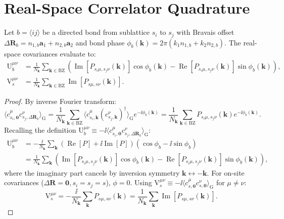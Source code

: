 \section{Real-Space Correlator Quadrature}
\label{sec:m1_3_correlator_quadrature}
\begin{theorem}
\label{thm:m1_3_bz_quadrature}
Let $b = \langle ij \rangle$ be a directed bond from sublattice $s_i$ to $s_j$ with Bravais offset $\Delta \mathbf{R}_b = n_{1, b} \mathbf{a}_1 + n_{2, b} \mathbf{a}_2$ and bond phase $\phi_b(\mathbf{k}) = 2\pi(k_1 n_{1, b} + k_2 n_{2, b})$. The real-space covariances evaluate to:
\begin{align}
\label{eq:m1_3_Ub_quadrature}
\mathrm{U}_b^{\mu\nu} &= \frac{1}{N_{\mathbf{k}}} \sum_{\mathbf{k} \in \mathrm{BZ}} \left( \operatorname{Im}[P_{s_i\mu, s_j\nu}(\mathbf{k})] \cos\phi_b(\mathbf{k}) - \operatorname{Re}[P_{s_i\mu, s_j\nu}(\mathbf{k})] \sin\phi_b(\mathbf{k}) \right), \\
\label{eq:m1_3_Vs_quadrature}
\mathrm{V}_s^{\mu\nu} &= \frac{1}{N_{\mathbf{k}}} \sum_{\mathbf{k} \in \mathrm{BZ}} \operatorname{Im}[P_{s\mu, s\nu}(\mathbf{k})].
\end{align}
\end{theorem}
\begin{proof}
By inverse Fourier transform:
\begin{equation}
\langle c_{s_i, \mathbf{0}}^\mu c_{s_j, \Delta\mathbf{R}_b}^\nu \rangle_{\mathrm{G}} = \frac{1}{N_{\mathbf{k}}} \sum_{\mathbf{k} \in \mathrm{BZ}} \langle c_{s_i, \mathbf{k}}^\mu (c_{s_j, \mathbf{k}}^\nu)^\dagger \rangle_{\mathrm{G}} e^{-\ii \phi_b(\mathbf{k})} = \frac{1}{N_{\mathbf{k}}} \sum_{\mathbf{k} \in \mathrm{BZ}} P_{s_i\mu, s_j\nu}(\mathbf{k}) e^{-\ii \phi_b(\mathbf{k})}.
\end{equation}
Recalling the definition $\mathrm{U}_b^{\mu\nu} \equiv -\ii \langle c_{s_i, \mathbf{0}}^\mu c_{s_j, \Delta\mathbf{R}_b}^\nu \rangle_{\mathrm{G}}$:
\begin{align}
\mathrm{U}_b^{\mu\nu} &= -\frac{\ii}{N_{\mathbf{k}}} \sum_{\mathbf{k}} (\operatorname{Re}[P] + \ii \operatorname{Im}[P]) (\cos\phi_b - \ii \sin\phi_b) \nonumber \\
&= \frac{1}{N_{\mathbf{k}}} \sum_{\mathbf{k}} \left( \operatorname{Im}[P_{s_i\mu, s_j\nu}(\mathbf{k})] \cos\phi_b(\mathbf{k}) - \operatorname{Re}[P_{s_i\mu, s_j\nu}(\mathbf{k})] \sin\phi_b(\mathbf{k}) \right),
\end{align}
where the imaginary part cancels by inversion symmetry $\mathbf{k} \leftrightarrow -\mathbf{k}$.
For on-site covariances ($\Delta\mathbf{R} = \mathbf{0}, s_i = s_j = s$), $\phi = 0$. Using $\mathrm{V}_s^{\mu\nu} \equiv -\ii \langle c_{s, \mathbf{0}}^\mu c_{s, \mathbf{0}}^\nu \rangle_{\mathrm{G}}$ for $\mu \ne \nu$:
\begin{equation}
\mathrm{V}_s^{\mu\nu} = -\frac{\ii}{N_{\mathbf{k}}} \sum_{\mathbf{k}} P_{s\mu, s\nu}(\mathbf{k}) = \frac{1}{N_{\mathbf{k}}} \sum_{\mathbf{k}} \operatorname{Im}[P_{s\mu, s\nu}(\mathbf{k})].
\end{equation}
\end{proof}

